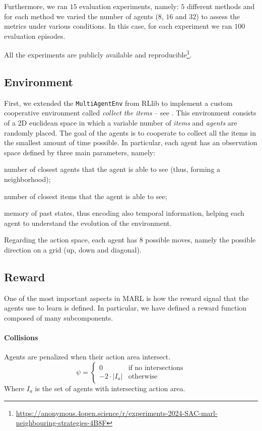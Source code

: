 \documentclass[sigconf]{acmart}
\begin{document}
Furthermore, we ran $15$ evaluation experiments, namely: $5$ different methods and for each method 
  we varied the number of agents ($8$, $16$ and $32$) to assess the metrics under various conditions.
  In this case, for each experiment we ran $100$ evaluation episodes.

All the experiments are publicly available and reproducible\footnote{\url{https://anonymous.4open.science/r/experiments-2024-SAC-marl-neighbouring-strategies-4B8F}}.

\subsection{Environment} 
First, we extended the \texttt{MultiAgentEnv} from RLlib to implement a custom cooperative environment 
  called \emph{collect the items} -- see .
%
This environment consists of a 2D euclidean space in which a variable number of \emph{items} and \emph{agents} 
 are randomly placed.
%
The goal of the agents is to cooperate to collect all the items in the smallest amount of time possible. 
%
In particular, each agent has an observation space defined by three main parameters, namely: 
\begin{enumerate*}[label=(\roman*)]
  \item number of closest agents that the agent is able to see (thus, forming a neighborhood);
  \item number of closest items that the agent is able to see;
  \item memory of past states, thus encoding also temporal information, helping each agent to understand 
    the evolution of the environment.
\end{enumerate*} 
%
Regarding the action space, each agent has $8$ possible moves, namely the possible direction on a grid 
  (up, down and diagonal).


\subsection{Reward}
One of the most important aspects in MARL is how the reward signal that the agents use to 
  learn is defined.
%
In particular, we have defined a reward function composed of many subcomponents.

\paragraph{Collisions} Agents are penalized when their action area intersect. 
  \[ \psi = \begin{cases}
    0 & \text{if no intersections} \\
    -2 \cdot |I_a| & \text{otherwise}
  \end{cases} \]
  Where $I_a$ is the set of agents with intersecting action area.
\end{document}
